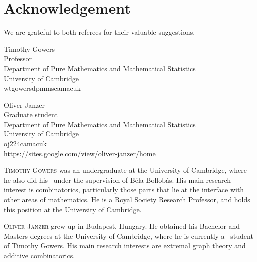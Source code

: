 \documentclass{toc}
\begin{document}
\section*{Acknowledgement}

We are grateful to both referees for their valuable suggestions.


%
%
%
%


%
%
%
%
%
\begin{tocauthors}
\begin{tocinfo}[gowers]
 Timothy Gowers\\
 Professor\\
 Department of Pure Mathematics and Mathematical Statistics\\
 University of Cambridge\\
 w\tocdot{}t\tocdot{}gowers\tocat{}dpmms\tocdot{}cam\tocdot{}ac\tocdot{}uk \\   %
\end{tocinfo}
\begin{tocinfo}[janzer]
  Oliver Janzer\\
  Graduate student\\
  Department of Pure Mathematics and Mathematical Statistics\\
  University of Cambridge\\
  oj224\tocat{}cam\tocdot{}ac\tocdot{}uk \\
  \url{https://sites.google.com/view/oliver-janzer/home}
\end{tocinfo}
\end{tocauthors}

%
%
%
%
%
%
%
%
%
%
%
%
%
%
\begin{tocaboutauthors}
\begin{tocabout}[gowers]  %
  \textsc{Timothy Gowers} was an undergraduate at the University of Cambridge, where he also did his \phd\ under the supervision of B\'ela Bollob\'as. His main research interest is combinatorics, particularly those parts that lie at the interface with other areas of mathematics. He is a Royal Society Research Professor, and holds this position at the University of Cambridge.
\end{tocabout}
\begin{tocabout}[janzer]
\textsc{Oliver Janzer} grew up in Budapest, Hungary. He obtained his Bachelor and Masters degrees at the University of Cambridge, where he is currently a \phd\ student of Timothy Gowers. His main research interests are extremal graph theory and additive combinatorics.
\end{tocabout}
\end{tocaboutauthors}
\end{document}
